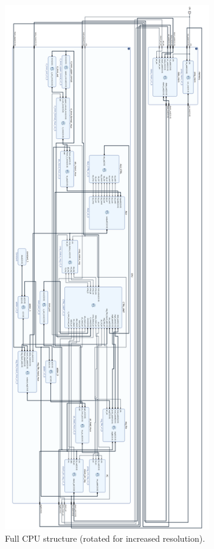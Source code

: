 \documentclass{article}
\begin{document}
\begin{par}
	\begin{figure}[H]
		\centering
		\includegraphics[width=3.5in]{img/dsf.png}
		\caption{Full CPU structure (rotated for increased resolution).}
	\end{figure}
	
\end{par}

\newpage
\end{document}
